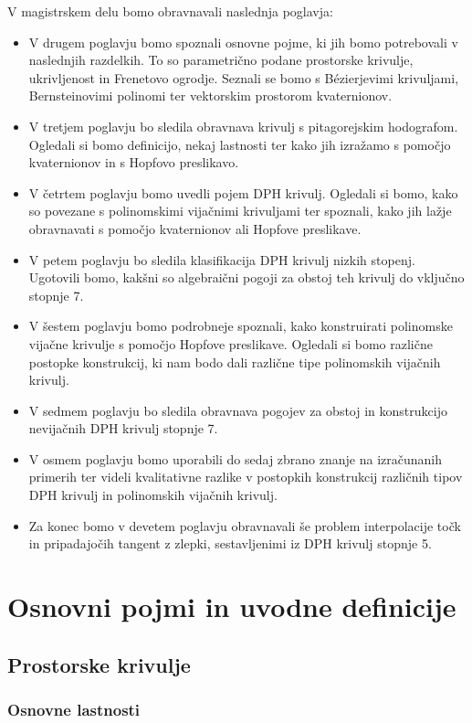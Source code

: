 \documentclass[12pt,a4paper,twoside]{article}
\theoremstyle{definition} %
\theoremstyle{plain} %
\theoremstyle{primerstyle}
\numberwithin{equation}{section}  %
\begin{document}
V magistrskem delu bomo obravnavali naslednja poglavja:
\begin{itemize}
	\item V drugem poglavju bomo spoznali osnovne pojme, ki jih bomo potrebovali v naslednjih razdelkih. To so parametrično podane prostorske krivulje, ukrivljenost in Frenetovo ogrodje. Seznali se bomo s Bézierjevimi krivuljami, Bernsteinovimi polinomi ter vektorskim prostorom kvaternionov.
	\item V tretjem poglavju bo sledila obravnava krivulj s pitagorejskim hodografom. Ogledali si bomo definicijo, nekaj lastnosti ter kako jih izražamo s pomočjo kvaternionov in s Hopfovo preslikavo.
	\item V četrtem poglavju bomo uvedli pojem DPH krivulj. Ogledali si bomo, kako so povezane s polinomskimi vijačnimi krivuljami ter spoznali, kako jih lažje obravnavati s pomočjo kvaternionov ali Hopfove preslikave.
	\item V petem poglavju bo sledila klasifikacija DPH krivulj nizkih stopenj. Ugotovili bomo, kakšni so algebraični pogoji za obstoj teh krivulj do vključno stopnje 7.
	\item V šestem poglavju bomo podrobneje spoznali, kako konstruirati polinomske vijačne krivulje s pomočjo Hopfove preslikave. Ogledali si bomo različne postopke konstrukcij, ki nam bodo dali različne tipe polinomskih vijačnih krivulj.
	\item V sedmem poglavju bo sledila obravnava pogojev za obstoj in konstrukcijo nevijačnih DPH krivulj stopnje 7.
	\item V osmem poglavju bomo uporabili do sedaj zbrano znanje na izračunanih primerih ter videli kvalitativne razlike v postopkih konstrukcij različnih tipov DPH krivulj in polinomskih vijačnih krivulj.
	\item Za konec bomo v devetem poglavju obravnavali še problem interpolacije točk in pripadajočih tangent z zlepki, sestavljenimi iz DPH krivulj stopnje 5.
\end{itemize}
\clearpage
\section{Osnovni pojmi in uvodne definicije}

\subsection{Prostorske krivulje}
\subsubsection{Osnovne lastnosti}
\end{document}
